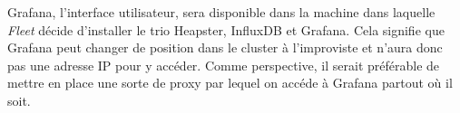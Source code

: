 \begin{onehalfspace}
Grafana, l'interface utilisateur, sera disponible dans la machine dans laquelle \emph{Fleet} décide d'installer le trio Heapster, InfluxDB et Grafana. Cela signifie que Grafana peut changer de position dans le cluster à l'improviste et n'aura donc pas une adresse IP pour y accéder. Comme perspective, il serait préférable de mettre en place une sorte de proxy par lequel on accéde à Grafana partout où il soit.



\end{onehalfspace}
